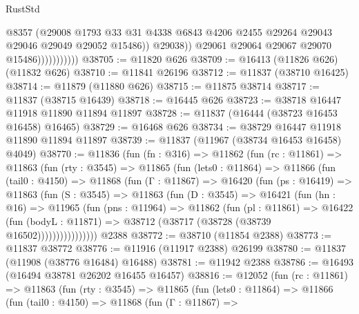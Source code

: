 \begin{lexlean}{RustStd}
\begin{coremodule}
                                @8357
                                (@29008
                                  @1793
                                  @33
                                  @31
                                  @4338
                                  @6843
                                  @4206
                                  @2455
                                  @29264
                                  @29043
                                  @29046
                                  @29049
                                  @29052
                                  @15486))
                              @29038))
                          @29061
                          @29064
                          @29067
                          @29070
                          @15486)))))))))))
@38705 := @11820 @626
@38709 := @16413 (@11826 @626) (@11832 @626)
@38710 := @11841 @26196
@38712 := @11837 (@38710 @16425)
@38714 := @11879 (@11880 @626)
@38715 := @11875 @38714
@38717 := @11837 (@38715 @16439)
@38718 := @16445 @626
@38723 := @38718 @16447 @11918 @11890 @11894 @11897
@38728 := @11837 (@16444 (@38723 @16453 @16458) @16465)
@38729 := @16468 @626
@38734 := @38729 @16447 @11918 @11890 @11894 @11897
@38739 := @11837 (@11967 (@38734 @16453 @16458) @4049)
@38770 := @11836
    (fun (fn : @316) =>
    @11862
      (fun (rc : @11861) =>
      @11863
        (fun (rty : @3545) =>
        @11865
          (fun (lets0 : @11864) =>
          @11866
            (fun (tail0 : @4150) =>
            @11868
              (fun (Γ : @11867) =>
              @16420
                (fun (ps : @16419) =>
                @11863
                  (fun (S : @3545) =>
                  @11863
                    (fun (D : @3545) =>
                    @16421
                      (fun (hn : @16) =>
                      @11965
                        (fun (pns : @11964) =>
                        @11862
                          (fun (pl : @11861) =>
                          @16422
                            (fun (bodyL : @11871) =>
                            @38712 (@38717 (@38728 (@38739 @16502))))))))))))))))
    @2388
@38772 := @38710 (@11854 @2388)
@38773 := @11837 @38772
@38776 := @11916 (@11917 @2388) @26199
@38780 := @11837 (@11908 (@38776 @16484) @16488)
@38781 := @11942 @2388
@38786 := @16493 (@16494 @38781 @26202 @16455 @16457)
@38816 := @12052
    (fun (rc : @11861) =>
    @11863
      (fun (rty : @3545) =>
      @11865
        (fun (lets0 : @11864) =>
        @11866
          (fun (tail0 : @4150) =>
          @11868
            (fun (Γ : @11867) =>

\end{coremodule}
\end{lexlean}
